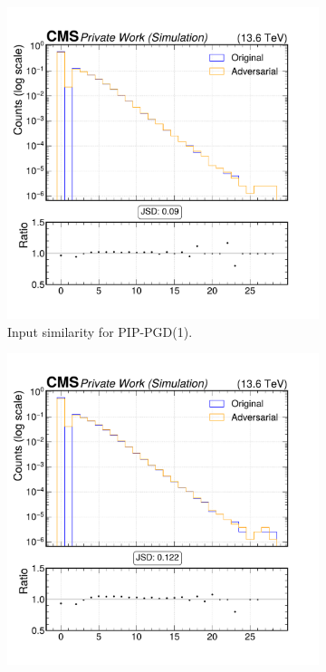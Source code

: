 \begin{figure}[h]
  \centering
  \begin{subfigure}[t]{0.32\textwidth}
    \includegraphics[width=\linewidth]{media/output/features/compare/combined_it_1/cmp_global_features_TagVarCSV_jetNTracksEtaRel.pdf}
    \caption*{Input similarity for PIP-PGD(1).}
  \end{subfigure}\hfill
  \begin{subfigure}[t]{0.32\textwidth}
    \includegraphics[width=\linewidth]{media/output/features/compare/combined_it_2/cmp_global_features_TagVarCSV_jetNTracksEtaRel.pdf}

\end{subfigure}
\end{figure}
